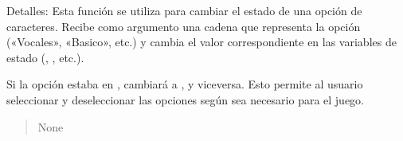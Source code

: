\documentclass[letterpaper,10pt,spanish]{sphinxmanual}
\begin{document}
\begin{fulllineitems}
\begin{fulllineitems}
\sphinxAtStartPar
Detalles:
Esta función se utiliza para cambiar el estado de una opción de caracteres. Recibe como argumento una cadena que
representa la opción («Vocales», «Basico», etc.) y cambia el valor correspondiente en las variables de estado
(, , etc.).

\sphinxAtStartPar
Si la opción estaba en , cambiará a , y viceversa. Esto permite al usuario seleccionar y
deseleccionar las opciones según sea necesario para el juego.
\begin{quote}\begin{description}
\sphinxAtStartPar
None

\end{description}\end{quote}

\end{fulllineitems}


\end{fulllineitems}

\end{document}
